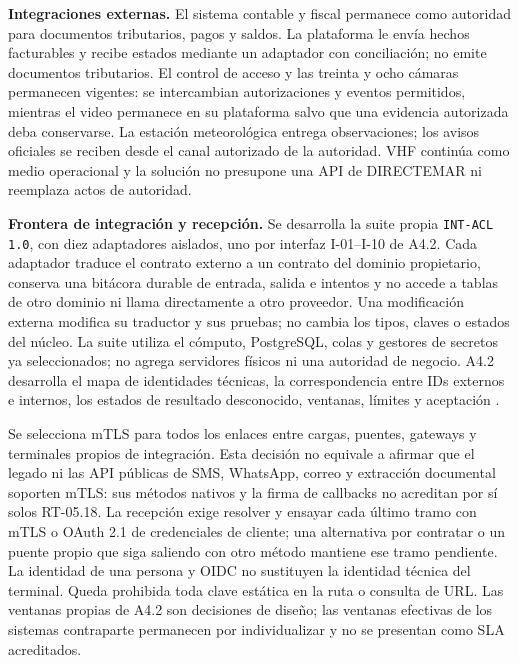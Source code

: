 \textbf{Integraciones externas.} El sistema contable y fiscal permanece como autoridad para documentos tributarios, pagos y saldos. La plataforma le envía hechos facturables y recibe estados mediante un adaptador con conciliación; no emite documentos tributarios. El control de acceso y las treinta y ocho cámaras permanecen vigentes: se intercambian autorizaciones y eventos permitidos, mientras el video permanece en su plataforma salvo que una evidencia autorizada deba conservarse. La estación meteorológica entrega observaciones; los avisos oficiales se reciben desde el canal autorizado de la autoridad. VHF continúa como medio operacional y la solución no presupone una API de DIRECTEMAR ni reemplaza actos de autoridad.

\textbf{Frontera de integración y recepción.} Se desarrolla la suite propia \texttt{INT-ACL 1.0}, con diez adaptadores aislados, uno por interfaz I-01--I-10 de A4.2. Cada adaptador traduce el contrato externo a un contrato del dominio propietario, conserva una bitácora durable de entrada, salida e intentos y no accede a tablas de otro dominio ni llama directamente a otro proveedor. Una modificación externa modifica su traductor y sus pruebas; no cambia los tipos, claves o estados del núcleo. La suite utiliza el cómputo, PostgreSQL, colas y gestores de secretos ya seleccionados; no agrega servidores físicos ni una autoridad de negocio. A4.2 desarrolla el mapa de identidades técnicas, la correspondencia entre IDs externos e internos, los estados de resultado desconocido, ventanas, límites y aceptación \parencite[RT-05.18--21, pp.~12--13]{pucv-transversal}.

Se selecciona mTLS para todos los enlaces entre cargas, puentes, gateways y terminales propios de integración. Esta decisión no equivale a afirmar que el legado ni las API públicas de SMS, WhatsApp, correo y extracción documental soporten mTLS: sus métodos nativos y la firma de callbacks no acreditan por sí solos RT-05.18. La recepción exige resolver y ensayar cada último tramo con mTLS o OAuth 2.1 de credenciales de cliente; una alternativa por contratar o un puente propio que siga saliendo con otro método mantiene ese tramo pendiente. La identidad de una persona y OIDC no sustituyen la identidad técnica del terminal. Queda prohibida toda clave estática en la ruta o consulta de URL. Las ventanas propias de A4.2 son decisiones de diseño; las ventanas efectivas de los sistemas contraparte permanecen por individualizar y no se presentan como SLA acreditados.

